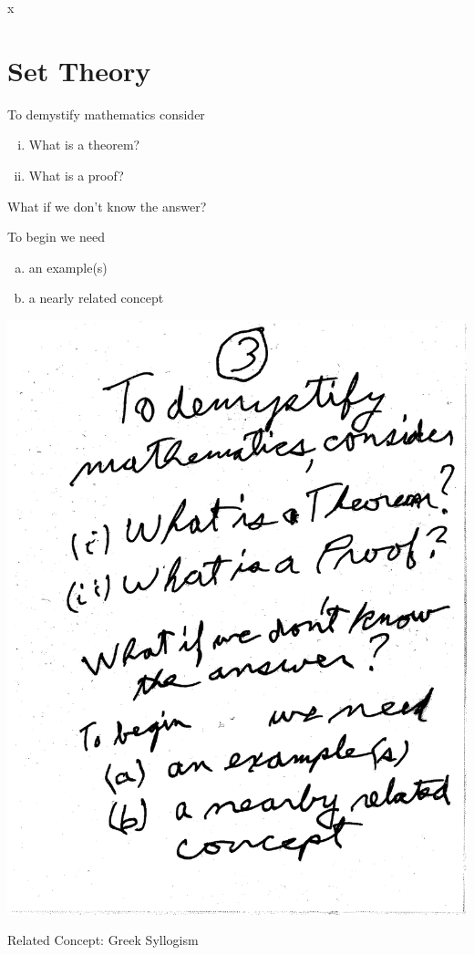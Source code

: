 \documentclass[10pt,a4paper]{article}
\begin{document}
x

\section{Set Theory}
To demystify mathematics consider
\begin{enumerate}[(i)]
\item What is a theorem?
\item What is a proof?
\end{enumerate}
What if we don't know the answer?

To begin we need
\begin{enumerate}[(a)]
\item an example(s)
\item a nearly related concept
\end{enumerate}


\includegraphics[scale=.5]{Pages/ST_3}

\newpage

Related Concept: Greek Syllogism
\end{document}
